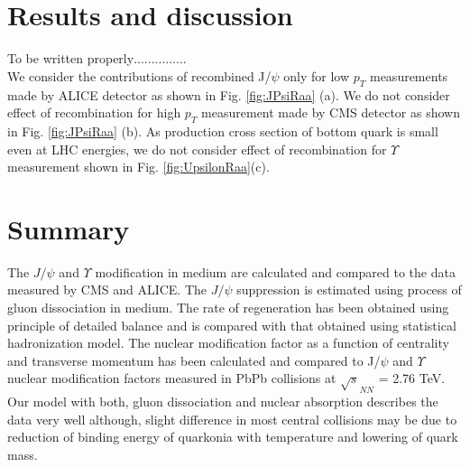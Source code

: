 \documentclass[aps,prc,preprint,superscriptaddress,showpacs,showkeys]{revtex4-1}
\begin{document}
\section{Results and discussion}
To be written properly$...............$\\
We consider the contributions of recombined J/$\psi$
only for low $p_{T}$ measurements made by ALICE detector as shown in Fig. \ref{fig:JPsiRaa} (a).     
 We do not consider effect of recombination for high $p_{T}$ measurement made by CMS detector \cite{CMSUpsilon,CMSJPsi} 
as shown in Fig. \ref{fig:JPsiRaa} (b). As production cross section of bottom quark is small even at LHC energies,
we do not consider effect of recombination for $\Upsilon$ measurement shown in Fig. \ref{fig:UpsilonRaa}(c).







\section{Summary}
 The $J/\psi$ and $\Upsilon$ modification in medium are calculated and compared to the data
measured by CMS and ALICE.
  The $J/\psi$ suppression is estimated using process of gluon dissociation in medium. The rate of regeneration 
has been obtained using principle of detailed balance and is compared with that obtained using statistical 
hadronization model. 
The nuclear modification factor as a function of centrality and transverse momentum has been calculated  
and compared to J/$\psi$ and $\Upsilon$ nuclear modification factors measured in PbPb collisions 
at $\sqrt s_{NN}$ =  2.76 TeV.
  Our model with both, gluon dissociation and nuclear absorption describes the data very well although, 
slight difference in most central collisions may be due to reduction of binding energy of quarkonia with temperature 
and lowering of quark mass.
\end{document}
